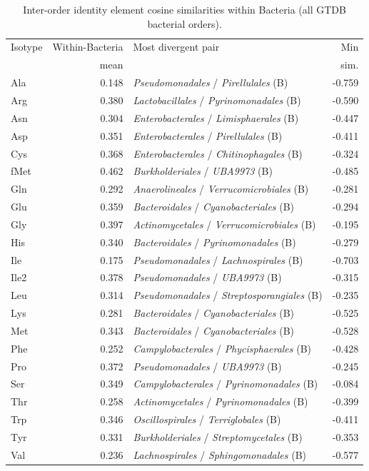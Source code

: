 \begin{table}[!ht]
\centering
\small
\caption{Inter-order identity element cosine similarities within Bacteria (all GTDB bacterial orders).}
\label{tab:order_identity_bacteria}
\begin{tabular}{lrlr}
\toprule
Isotype & \multicolumn{1}{c}{Within-Bacteria} & Most divergent pair & Min \\
 & mean & & sim. \\
\midrule
  Ala & 0.148 & \textit{Pseudomonadales} / \textit{Pirellulales} (B) & -0.759 \\
  Arg & 0.380 & \textit{Lactobacillales} / \textit{Pyrinomonadales} (B) & -0.590 \\
  Asn & 0.304 & \textit{Enterobacterales} / \textit{Limisphaerales} (B) & -0.447 \\
  Asp & 0.351 & \textit{Enterobacterales} / \textit{Pirellulales} (B) & -0.411 \\
  Cys & 0.368 & \textit{Enterobacterales} / \textit{Chitinophagales} (B) & -0.324 \\
  fMet & 0.462 & \textit{Burkholderiales} / \textit{UBA9973} (B) & -0.485 \\
  Gln & 0.292 & \textit{Anaerolineales} / \textit{Verrucomicrobiales} (B) & -0.281 \\
  Glu & 0.359 & \textit{Bacteroidales} / \textit{Cyanobacteriales} (B) & -0.294 \\
  Gly & 0.397 & \textit{Actinomycetales} / \textit{Verrucomicrobiales} (B) & -0.195 \\
  His & 0.340 & \textit{Bacteroidales} / \textit{Pyrinomonadales} (B) & -0.279 \\
  Ile & 0.175 & \textit{Pseudomonadales} / \textit{Lachnospirales} (B) & -0.703 \\
  Ile2 & 0.378 & \textit{Pseudomonadales} / \textit{UBA9973} (B) & -0.315 \\
  Leu & 0.314 & \textit{Pseudomonadales} / \textit{Streptosporangiales} (B) & -0.235 \\
  Lys & 0.281 & \textit{Bacteroidales} / \textit{Cyanobacteriales} (B) & -0.525 \\
  Met & 0.343 & \textit{Bacteroidales} / \textit{Cyanobacteriales} (B) & -0.528 \\
  Phe & 0.252 & \textit{Campylobacterales} / \textit{Phycisphaerales} (B) & -0.428 \\
  Pro & 0.372 & \textit{Pseudomonadales} / \textit{UBA9973} (B) & -0.245 \\
  Ser & 0.349 & \textit{Campylobacterales} / \textit{Pyrinomonadales} (B) & -0.084 \\
  Thr & 0.258 & \textit{Actinomycetales} / \textit{Pyrinomonadales} (B) & -0.399 \\
  Trp & 0.346 & \textit{Oscillospirales} / \textit{Terriglobales} (B) & -0.411 \\
  Tyr & 0.331 & \textit{Burkholderiales} / \textit{Streptomycetales} (B) & -0.353 \\
  Val & 0.236 & \textit{Lachnospirales} / \textit{Sphingomonadales} (B) & -0.577 \\
\bottomrule
\end{tabular}
\end{table}

